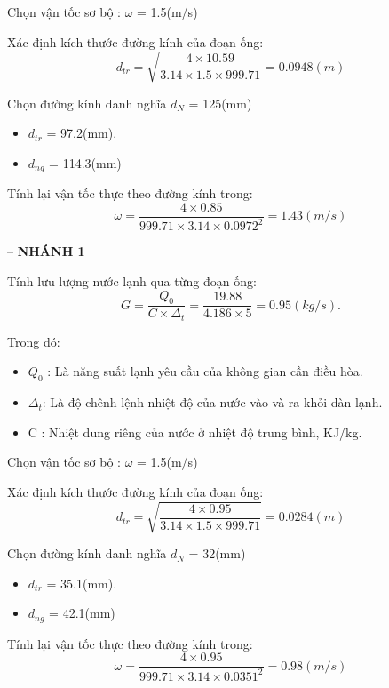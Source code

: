 Chọn vận tốc sơ bộ : $\omega$ = 1.5(m/s)

Xác định kích thước đường kính của đoạn ống:
\begin{equation*}
	d_{tr} = \sqrt{\dfrac{4 \times 10.59}{3.14 \times 1.5 \times 999.71}} = 0.0948(m)
\end{equation*}

Chọn đường kính danh nghĩa $d_{N}$ = 125(mm)
\begin{itemize}
	\item $d_{tr}$ = 97.2(mm).
	\item $d_{ng}$ = 114.3(mm)
\end{itemize}

Tính lại vận tốc thực theo đường kính trong:
\begin{equation*}
	\omega = \dfrac{4 \times 0.85 }{999.71 \times 3.14 \times 0.0972^{2}} = 1.43(m/s)
\end{equation*}

-- \textbf{NHÁNH 1}

Tính lưu lượng nước lạnh qua từng đoạn ống:
\begin{equation*}
	G = \dfrac{Q_{0}}{C \times \Delta_{t}} =\dfrac{19.88}{4.186 \times 5} = 0.95(kg/s).
\end{equation*}

Trong đó:
\begin{itemize}
	\item $Q_{0}$ : Là năng suất lạnh yêu cầu của không gian cần điều hòa.
	\item $\Delta_{t}$: Là độ chênh lệnh nhiệt độ của nước vào và ra khỏi dàn lạnh.
	\item C : Nhiệt dung riêng của nước ở nhiệt độ trung bình, KJ/kg.
\end{itemize}

Chọn vận tốc sơ bộ : $\omega$ = 1.5(m/s)

Xác định kích thước đường kính của đoạn ống:
\begin{equation*}
	d_{tr} = \sqrt{\dfrac{4 \times 0.95}{3.14 \times 1.5 \times 999.71}} = 0.0284(m)
\end{equation*}

Chọn đường kính danh nghĩa $d_{N}$ = 32(mm)
\begin{itemize}
	\item $d_{tr}$ = 35.1(mm).
	\item $d_{ng}$ = 42.1(mm)
\end{itemize}

Tính lại vận tốc thực theo đường kính trong:
\begin{equation*}
	\omega = \dfrac{4 \times 0.95 }{999.71 \times 3.14 \times 0.0351^{2}} = 0.98(m/s)
\end{equation*}

